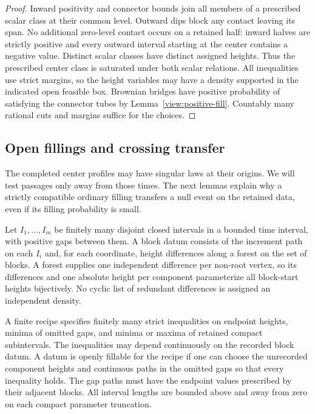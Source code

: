 \begin{proof}
Inward positivity and connector bounds join all members of a prescribed
scalar class at their common level.  Outward dips block any contact
leaving its span.  No additional zero-level contact occurs on a retained
half: inward halves are strictly positive and every outward interval
starting at the center contains a negative value.  Distinct scalar
classes have distinct assigned heights.  Thus the prescribed center
class is saturated under both scalar relations.  All inequalities use
strict margins, so the height variables may have a density supported in
the indicated open feasible box.  Brownian bridges have positive
probability of satisfying the connector tubes by
Lemma~\ref{view:positive-fill}.  Countably many rational cuts and margins
suffice for the choices.
\end{proof}

\subsection{Open fillings and crossing transfer}

The completed center profiles may have singular laws at their origins.
We will test passages only away from those times.  The next lemmas
explain why a strictly compatible ordinary filling transfers a null
event on the retained data, even if its filling probability is small.

Let $I_1,\ldots,I_m$ be finitely many disjoint closed intervals in a bounded
time interval, with positive gaps between them.  A block datum consists of
the increment path on each $I_i$ and, for each coordinate, height differences
along a forest on the set of blocks.  A forest supplies one independent
difference per non-root vertex, so its differences and one absolute height
per component parameterize all block-start heights bijectively.  No cyclic
list of redundant differences is assigned an independent density.

\begin{definition}\label{view:fillable}
A finite recipe specifies finitely many strict inequalities on endpoint
heights, minima of omitted gaps, and minima or maxima of retained compact
subintervals.  The inequalities may depend continuously on the recorded
block datum.  A datum is openly fillable for the recipe if one can choose
the unrecorded component heights and continuous paths in the omitted gaps
so that every inequality holds.  The gap paths must have the endpoint
values prescribed by their adjacent blocks.  All interval lengths are
bounded above and away from zero on each compact parameter truncation.
\end{definition}

